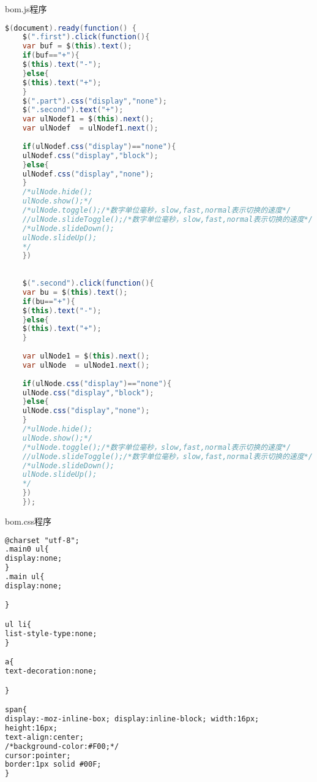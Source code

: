 bom.js程序
\begin{lstlisting}[language=Java]
	$(document).ready(function() {
	$(".first").click(function(){
	var buf = $(this).text(); 
	if(buf=="+"){
	$(this).text("-");
	}else{
	$(this).text("+");
	}
	$(".part").css("display","none");
	$(".second").text("+");
	var ulNodef1 = $(this).next();
	var ulNodef  = ulNodef1.next();
	
	if(ulNodef.css("display")=="none"){
	ulNodef.css("display","block");
	}else{
	ulNodef.css("display","none");
	}
	/*ulNode.hide();
	ulNode.show();*/
	/*ulNode.toggle();/*数字单位毫秒，slow,fast,normal表示切换的速度*/
	//ulNode.slideToggle();/*数字单位毫秒，slow,fast,normal表示切换的速度*/
	/*ulNode.slideDown();
	ulNode.slideUp();
	*/
	})
	
	
	$(".second").click(function(){
	var bu = $(this).text(); 
	if(bu=="+"){
	$(this).text("-");
	}else{
	$(this).text("+");
	}
	
	var ulNode1 = $(this).next();
	var ulNode  = ulNode1.next();
	
	if(ulNode.css("display")=="none"){
	ulNode.css("display","block");
	}else{
	ulNode.css("display","none");
	}
	/*ulNode.hide();
	ulNode.show();*/
	/*ulNode.toggle();/*数字单位毫秒，slow,fast,normal表示切换的速度*/
	//ulNode.slideToggle();/*数字单位毫秒，slow,fast,normal表示切换的速度*/
	/*ulNode.slideDown();
	ulNode.slideUp();
	*/
	})
	});
\end{lstlisting}

bom.css程序
\begin{lstlisting}[language=HTML]
@charset "utf-8";
.main0 ul{
display:none;
}
.main ul{
display:none;

}

ul li{
list-style-type:none;
}

a{
text-decoration:none;

}

span{
display:-moz-inline-box; display:inline-block; width:16px;
height:16px;
text-align:center;
/*background-color:#F00;*/
cursor:pointer;
border:1px solid #00F;
}

\end{lstlisting}
